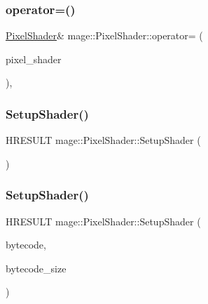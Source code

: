 \hypertarget{classmage_1_1_pixel_shader_aaeab6f6fda7d6e1f7d333da03d58daf9}{}\label{classmage_1_1_pixel_shader_aaeab6f6fda7d6e1f7d333da03d58daf9} 
\subsubsection{\texorpdfstring{operator=()}{operator=()}\hspace{0.1cm}{\footnotesize\ttfamily [2/2]}}
{\footnotesize\ttfamily \hyperlink{classmage_1_1_pixel_shader}{Pixel\+Shader}\& mage\+::\+Pixel\+Shader\+::operator= (\begin{DoxyParamCaption}\item[{\hyperlink{classmage_1_1_pixel_shader}{Pixel\+Shader} \&\&}]{pixel\+\_\+shader }\end{DoxyParamCaption})\hspace{0.3cm}{\ttfamily [private]}, {\ttfamily [delete]}}

\hypertarget{classmage_1_1_pixel_shader_adb9c1f330ef9958a7fc46c40c98a2b57}{}\label{classmage_1_1_pixel_shader_adb9c1f330ef9958a7fc46c40c98a2b57} 
\subsubsection{\texorpdfstring{Setup\+Shader()}{SetupShader()}\hspace{0.1cm}{\footnotesize\ttfamily [1/2]}}
{\footnotesize\ttfamily H\+R\+E\+S\+U\+LT mage\+::\+Pixel\+Shader\+::\+Setup\+Shader (\begin{DoxyParamCaption}{ }\end{DoxyParamCaption})\hspace{0.3cm}{\ttfamily [private]}}

\hypertarget{classmage_1_1_pixel_shader_a3df5b0c0eee682dad0406409e6df2a11}{}\label{classmage_1_1_pixel_shader_a3df5b0c0eee682dad0406409e6df2a11} 
\subsubsection{\texorpdfstring{Setup\+Shader()}{SetupShader()}\hspace{0.1cm}{\footnotesize\ttfamily [2/2]}}
{\footnotesize\ttfamily H\+R\+E\+S\+U\+LT mage\+::\+Pixel\+Shader\+::\+Setup\+Shader (\begin{DoxyParamCaption}\item[{const void $\ast$}]{bytecode,  }\item[{S\+I\+Z\+E\+\_\+T}]{bytecode\+\_\+size }\end{DoxyParamCaption})\hspace{0.3cm}{\ttfamily [private]}}



